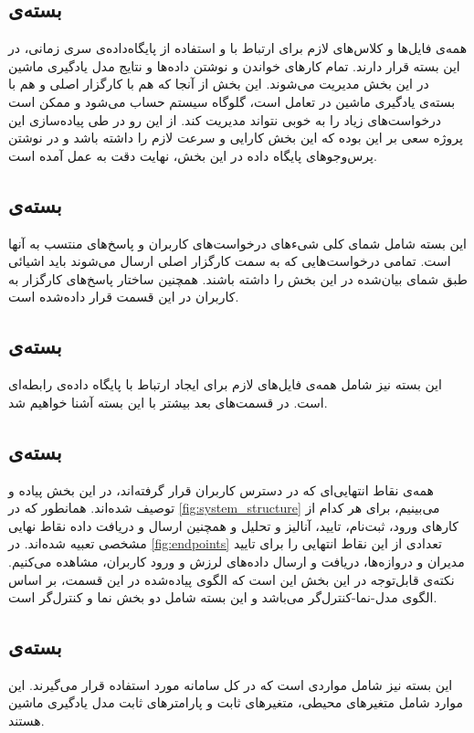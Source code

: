 \subsection{بسته‌ی }
همه‌ی فایل‌ها و کلاس‌های لازم برای ارتباط با و استفاده از پایگاه‌داده‌ی سری زمانی، در این بسته قرار دارند. تمام کارهای خواندن و نوشتن داده‌ها و نتایج مدل یادگیری ماشین در این بخش مدیریت می‌شوند. این بخش از آنجا که هم با کارگزار اصلی و هم با بسته‌ی یادگیری ماشین در تعامل است، گلوگاه سیستم حساب می‌شود و ممکن است درخواست‌های زیاد را به خوبی نتواند مدیریت کند. از این رو در طی پیاده‌سازی این پروژه سعی بر این بوده که این بخش کارایی و سرعت لازم را داشته‌ باشد و در نوشتن پرس‌وجوهای پایگاه داده در این بخش، نهایت دقت به عمل آمده است.

\subsection{بسته‌ی }
این بسته شامل شمای کلی شی‌ء‌های در‌خواست‌های کاربران و پاسخ‌های منتسب به آنها است\cite{deacon2009model}. تمامی درخواست‌هایی که به سمت کارگزار اصلی ارسال می‌شوند باید اشیائی طبق شمای بیان‌شده در این بخش را داشته‌ باشند. همچنین ساختار پاسخ‌های کارگزار به کاربران در این قسمت قرار داده‌شده است.

\subsection{بسته‌ی }
این بسته نیز شامل همه‌ی فایل‌های لازم برای ایجاد ارتباط با پایگاه‌ داده‌ی رابطه‌ای است. در قسمت‌های بعد بیشتر با این بسته آشنا خواهیم شد.

\subsection{بسته‌ی }
همه‌ی نقاط انتهایی‌ای که در دسترس کاربران قرار گرفته‌اند، در این بخش پیاده و توصیف شده‌اند. همانطور که در \cref{fig:system_structure} می‌بینیم، برای هر کدام از کارهای ورود، ثبت‌نام، تایید، آنالیز و تحلیل و همچنین ارسال و دریافت داده نقاط نهایی مشخصی تعبیه ‌شده‌اند. در \cref{fig:endpoints} تعدادی از این نقاط انتهایی را برای تایید مدیران و دروازه‌ها، دریافت و ارسال داده‌های لرزش و ورود کاربران، مشاهده می‌کنیم. نکته‌ی قابل‌توجه در این بخش این است که الگوی پیاده‌شده در این قسمت، بر اساس الگوی مدل-نما-کنترل‌گر\cite{deacon2009model} می‌باشد و این بسته شامل دو بخش نما و کنترل‌گر است.

\subsection{بسته‌ی }
این بسته نیز شامل مواردی است که در کل سامانه مورد استفاده قرار می‌گیرند. این موارد شامل متغیر‌های محیطی، متغیر‌های ثابت و پارامتر‌های ثابت مدل یادگیری ماشین هستند.


